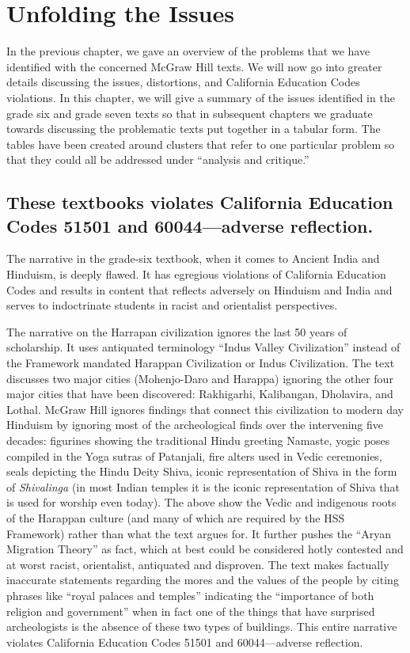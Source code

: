 \chapter{Unfolding the Issues}

In the previous chapter, we gave an overview of the problems that we have identified with the concerned McGraw Hill texts. We will now go into greater details discussing the issues, distortions, and California Education Codes violations. In this chapter, we will give a summary of the issues identified in the grade six and grade seven texts so that in subsequent chapters we graduate towards discussing the problematic texts put together in a tabular form. The tables have been created around clusters that refer to one particular problem so that they could all be addressed under “analysis and critique.”  
\vskip -10pt

\section*{These textbooks violates California Education Codes 51501 and 60044—adverse reflection.} 
\vskip -6pt

The narrative in the grade-six textbook, when it comes to Ancient India and Hinduism, is deeply flawed. It has egregious violations of California Education Codes and results in content that reflects adversely on Hinduism and India and serves to indoctrinate students in racist and orientalist perspectives.

The narrative on the Harrapan civilization ignores the last 50 years of scholarship. It uses antiquated terminology “Indus Valley Civilization” instead of the Framework mandated Harappan Civilization or Indus Civilization. The text discusses two major cities (Mohenjo-Daro and Harappa) ignoring the other four major cities that have been discovered: Rakhigarhi, Kalibangan, Dholavira, and Lothal. McGraw Hill ignores findings that connect this civilization to modern day Hinduism by ignoring most of the archeological finds over the intervening five decades: figurines showing the traditional Hindu greeting Namaste, yogic poses compiled in the Yoga sutras of Patanjali, fire alters used in Vedic ceremonies, seals depicting the Hindu Deity Shiva, iconic representation of Shiva in the form of \textit{Shivalinga}  (in most Indian temples it is the iconic representation of Shiva that is used for worship even today). The above show the Vedic and indigenous roots of the Harappan culture (and many of which are required by the HSS Framework) rather than what the text argues for. It further pushes the “Aryan Migration Theory” as fact, which at best could be considered hotly contested and at worst racist, orientalist, antiquated and disproven. The text makes factually inaccurate statements regarding the mores and the values of the people by citing phrases like “royal palaces and temples” indicating the “importance of both religion and government” when in fact one of the things that have surprised archeologists is the absence of these two types of buildings. This entire narrative violates California Education Codes 51501 and 60044—adverse reflection.  

